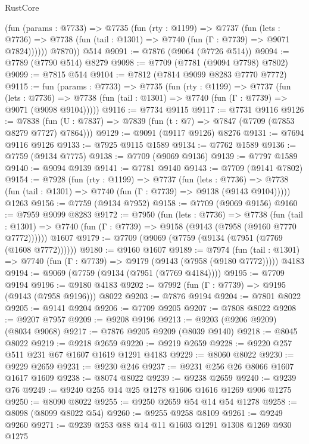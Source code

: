 \begin{lexlean}{RustCore}
\begin{coremodule}
          (fun (params : @7733) =>
          @7735
            (fun (rty : @1199) =>
            @7737
              (fun (lets : @7736) =>
              @7738 (fun (tail : @1301) => @7740 (fun (Γ : @7739) => @9071 @7824))))))
        @7870))
    @514
@9091 := @7876 (@9064 (@7726 @514))
@9094 := @7789 (@7790 @514) @8279
@9098 := @7709 (@7781 (@9094 @7798) @7802)
@9099 := @7815 @514
@9104 := @7812 (@7814 @9099 @8283 @7770 @7772)
@9115 := fun (params : @7733) =>
  @7735
    (fun (rty : @1199) =>
    @7737
      (fun (lets : @7736) =>
      @7738 (fun (tail : @1301) => @7740 (fun (Γ : @7739) => @9071 (@9098 @9104)))))
@9116 := @7734 @9115
@9117 := @7731 @9116
@9126 := @7838 (fun (U : @7837) => @7839 (fun (t : @7) => @7847 (@7709 (@7853 @8279 @7727) @7864)))
@9129 := @9091 (@9117 @9126) @8276
@9131 := @7694 @9116 @9126
@9133 := @7925 @9115 @1589
@9134 := @7762 @1589
@9136 := @7759 (@9134 @7775)
@9138 := @7709 (@9069 @9136)
@9139 := @7797 @1589
@9140 := @9094 @9139
@9141 := @7781 @9140
@9143 := @7709 (@9141 @7802)
@9154 := @7928
    (fun (rty : @1199) =>
    @7737
      (fun (lets : @7736) =>
      @7738 (fun (tail : @1301) => @7740 (fun (Γ : @7739) => @9138 (@9143 @9104)))))
    @1263
@9156 := @7759 (@9134 @7952)
@9158 := @7709 (@9069 @9156)
@9160 := @7959 @9099 @8283
@9172 := @7950
    (fun (lets : @7736) =>
    @7738
      (fun (tail : @1301) => @7740 (fun (Γ : @7739) => @9158 (@9143 (@7958 (@9160 @7770 @7772))))))
    @1607
@9179 := @7709 (@9069 (@7759 (@9134 (@7951 (@7769 (@1608 @7772))))))
@9180 := @9160 @1607
@9189 := @7974
    (fun (tail : @1301) => @7740 (fun (Γ : @7739) => @9179 (@9143 (@7958 (@9180 @7772)))))
    @4183
@9194 := @9069 (@7759 (@9134 (@7951 (@7769 @4184))))
@9195 := @7709 @9194
@9196 := @9180 @4183
@9202 := @7992 (fun (Γ : @7739) => @9195 (@9143 (@7958 @9196))) @8022
@9203 := @7876 @9194
@9204 := @7801 @8022
@9205 := @9141 @9204
@9206 := @7709 @9205
@9207 := @7808 @8022
@9208 := @9207 @7957
@9209 := @9208 @9196
@9213 := @9203 (@9206 @9209) (@8034 @9068)
@9217 := @7876 @9205 @9209 (@8039 @9140)
@9218 := @8045 @8022
@9219 := @9218 @2659
@9220 := @9219 @2659
@9228 := @9220 @257 @511 @231 @67 @1607 @1619 @1291 @4183
@9229 := @8060 @8022
@9230 := @9229 @2659
@9231 := @9230 @246
@9237 := @9231 @256 @26 @8066 @1607 @1617 @1609
@9238 := @8074 @8022
@9239 := @9238 @2659
@9240 := @9239 @76
@9249 := @9240 @255 @14 @25 @1278 @1606 @1616 @1269 @906 @1275
@9250 := @8090 @8022
@9255 := @9250 @2659 @54 @14 @54 @1278
@9258 := @8098 (@8099 @8022 @54)
@9260 := @9255 @9258 @8109
@9261 := @9249 @9260
@9271 := @9239 @253 @88 @14 @11 @1603 @1291 @1308 @1269 @930 @1275

\end{coremodule}
\end{lexlean}
